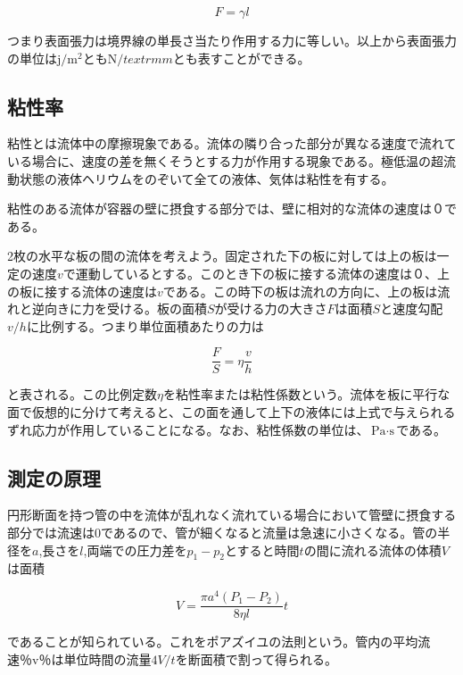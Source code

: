 \documentclass{jsarticle}
\begin{document}
\begin{equation}
    F = \gamma l
\end{equation}

つまり表面張力は境界線の単長さ当たり作用する力に等しい。以上から表面張力の単位は$\textrm{j}/\textrm{m}^2$とも$\textrm{N}/textrm{m}$とも表すことができる。

\subsection{粘性率}

粘性とは流体中の摩擦現象である。流体の隣り合った部分が異なる速度で流れている場合に、速度の差を無くそうとする力が作用する現象である。極低温の超流動状態の液体ヘリウムをのぞいて全ての液体、気体は粘性を有する。\\
\par 粘性のある流体が容器の壁に摂食する部分では、壁に相対的な流体の速度は０である。\\
\par 2枚の水平な板の間の流体を考えよう。固定された下の板に対しては上の板は一定の速度$v$で運動しているとする。このとき下の板に接する流体の速度は０、上の板に接する流体の速度は$v$である。この時下の板は流れの方向に、上の板は流れと逆向きに力を受ける。板の面積$S$が受ける力の大きさ$F$は面積$S$と速度勾配$v/h$に比例する。つまり単位面積あたりの力は

\begin{equation}
    \frac{F}{S} = \eta\frac{v}{h}
\end{equation}

と表される。この比例定数$\eta$を粘性率または粘性係数という。流体を板に平行な面で仮想的に分けて考えると、この面を通して上下の液体には上式で与えられるずれ応力が作用していることになる。なお、粘性係数の単位は、$\textrm{Pa}\cdot\textrm{s}$である。

\subsection{測定の原理}

円形断面を持つ管の中を流体が乱れなく流れている場合において管壁に摂食する部分では流速は0であるので、管が細くなると流量は急速に小さくなる。管の半径を$a$,長さを$l$,両端での圧力差を$p_1 - p_2$とすると時間$t$の間に流れる流体の体積$V$は面積

\begin{equation}
    V = \frac{\pi a^4(P_1 - P_2)}{8\eta l}t
\end{equation}

であることが知られている。これをポアズイユの法則という。管内の平均流速％v％は単位時間の流量$4V/t$を断面積で割って得られる。
\end{document}
